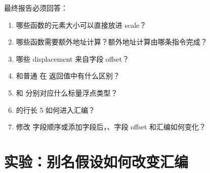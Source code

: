 \begin{labbox}
最终报告必须回答：

\begin{enumerate}
  \item 哪些函数的元素大小可以直接放进 scale？
  \item 哪些函数需要额外地址计算？额外地址计算由哪条指令完成？
  \item 哪些 displacement 来自字段 offset？
  \item {} 和普通  在  返回值中有什么区别？
  \item {} 和  分别对应什么标量浮点类型？
  \item {} 的行长 5 如何进入汇编？
  \item 修改  字段顺序或添加字段后，、字段 offset 和汇编如何变化？
\end{enumerate}
\end{labbox}

\section{实验：别名假设如何改变汇编}

